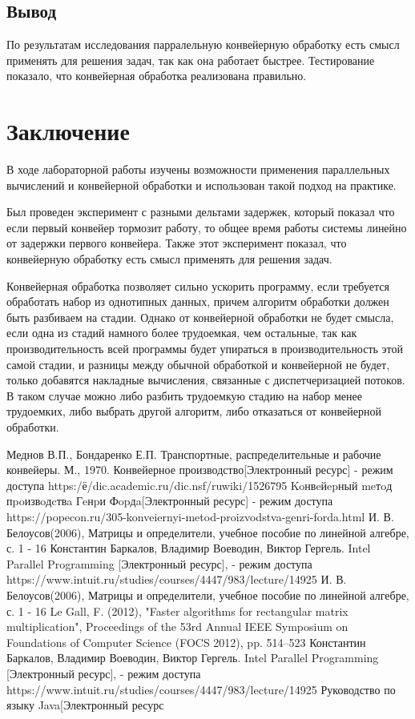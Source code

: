 \documentclass[12pt]{report}
\begin{document}
\section{Вывод}
По результатам исследования парралельную конвейерную обработку есть смысл применять для решения задач, так как она работает быстрее.
Тестирование показало, что конвейерная обработка реализована правильно.

\chapter*{Заключение}
В ходе лабораторной работы изучены возможности применения параллельных вычислений и конвейерной обработки и использован такой подход на практике. 

Был проведен эксперимент с разными дельтами задержек, который показал что если первый конвейер тормозит работу, то общее время работы системы
линейно от задержки первого конвейера. Также этот эксперимент показал, что конвейерную обработку есть смысл применять для решения задач.

Конвейерная обработка позволяет сильно ускорить программу, если требуется обработать набор из однотипных данных, причем алгоритм обработки должен быть разбиваем на стадии. Однако от конвейерной обработки не будет смысла, если одна из стадий намного более трудоемкая, чем остальные, так как производительность всей программы будет упираться в производительность этой самой стадии, и разницы между обычной обработкой и конвейерной не будет, только добавятся накладные вычисления, связанные с диспетчеризацией потоков. В таком случае можно либо разбить трудоемкую стадию на набор менее трудоемких, либо выбрать другой алгоритм, либо отказаться от конвейерной обработки.

 \begin{thebibliography}{3}
 Меднов В.П., Бондаренко Е.П. Транспортные, распределительные и рабочие конвейеры. М., 1970.
 Конвейерное производство[Электронный ресурс] - режим доступа https:/ё/dic.academic.ru/dic.nsf/ruwiki/1526795
 Koнвeйepный meтoд пpoизвoдcтвa Гeнpи Фopдa[Электронный ресурс] - режим доступа https://popecon.ru/305-konveiernyi-metod-proizvodstva-genri-forda.html
 И. В. Белоусов(2006), Матрицы и определители, учебное пособие по линейной алгебре, с. 1 - 16
 Константин Баркалов, Владимир Воеводин, Виктор Гергель. Intel Parallel Programming [Электронный ресурс], - режим доступа https://www.intuit.ru/studies/courses/4447/983/lecture/14925
И. В. Белоусов(2006), Матрицы и определители, учебное пособие по линейной алгебре, с. 1 - 16
Le Gall, F. (2012), "Faster algorithms for rectangular matrix multiplication", Proceedings of the 53rd Annual IEEE Symposium on Foundations of Computer Science (FOCS 2012), pp. 514–523
Константин Баркалов, Владимир Воеводин, Виктор Гергель. Intel Parallel Programming [Электронный ресурс], - режим доступа https://www.intuit.ru/studies/courses/4447/983/lecture/14925
Руководство по языку Java[Электронный ресурс
\end{thebibliography}
\end{document}
